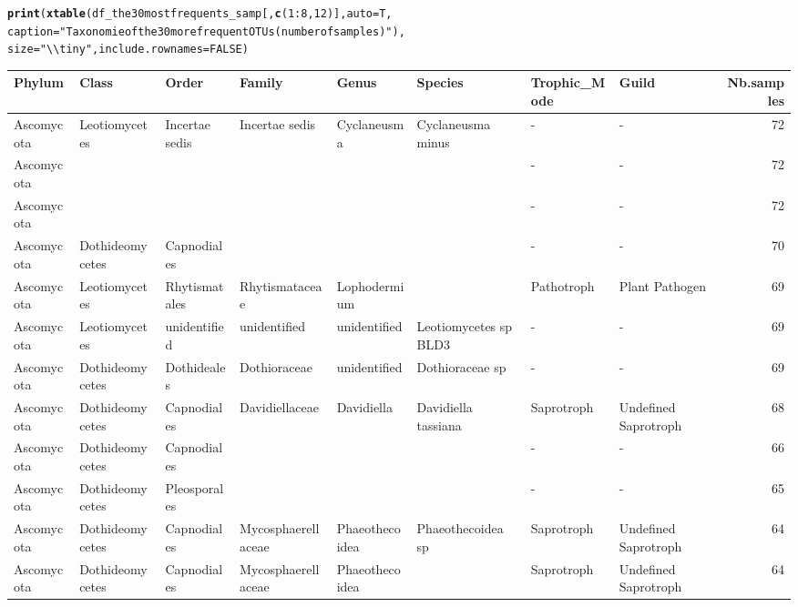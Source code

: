 \documentclass[12pt]{article}\usepackage[]{graphicx}\usepackage[]{color}
\makeatletter
\newcommand{\hlnum}[1]{\textcolor[rgb]{0.686,0.059,0.569}{#1}}%
\newcommand{\hlstr}[1]{\textcolor[rgb]{0.192,0.494,0.8}{#1}}%
\newcommand{\hlopt}[1]{\textcolor[rgb]{0,0,0}{#1}}%
\newcommand{\hlstd}[1]{\textcolor[rgb]{0.345,0.345,0.345}{#1}}%
\newcommand{\hlkwc}[1]{\textcolor[rgb]{0.333,0.667,0.333}{#1}}%
\newcommand{\hlkwd}[1]{\textcolor[rgb]{0.737,0.353,0.396}{\textbf{#1}}}%
\newenvironment{kframe}{%
 \def\at@end@of@kframe{}%
 \ifinner\ifhmode%
  \def\at@end@of@kframe{\end{minipage}}%
  \begin{minipage}{\columnwidth}%
 \fi\fi%
 \def\FrameCommand##1{\hskip\@totalleftmargin \hskip-\fboxsep
 \colorbox{shadecolor}{##1}\hskip-\fboxsep
     \hskip-\linewidth \hskip-\@totalleftmargin \hskip\columnwidth}%
 \MakeFramed {\advance\hsize-\width
   \@totalleftmargin\z@ \linewidth\hsize
   \@setminipage}}%
 {\par\unskip\endMakeFramed%
 \at@end@of@kframe}
\numberwithin{figure}{section}
\makeatother
\begin{document}
\begin{landscape}
\begin{kframe}
\begin{alltt}
\hlkwd{print}\hlstd{(}\hlkwd{xtable}\hlstd{(df_the30mostfrequents_samp[,} \hlkwd{c}\hlstd{(}\hlnum{1}\hlopt{:}\hlnum{8}\hlstd{,} \hlnum{12}\hlstd{)],} \hlkwc{auto} \hlstd{= T,}
      \hlkwc{caption} \hlstd{=} \hlstr{"Taxonomie of the 30 more frequent OTUs (number of samples)"}\hlstd{),}
      \hlkwc{size} \hlstd{=} \hlstr{"\textbackslash{}\textbackslash{}tiny"}\hlstd{,} \hlkwc{include.rownames} \hlstd{=} \hlnum{FALSE}\hlstd{)}
\end{alltt}
\end{kframe}%
\begin{table}[ht]
\centering
\begingroup\tiny
\begin{tabular}{llllllllr}
  \hline
Phylum & Class & Order & Family & Genus & Species & Trophic\_Mode & Guild & Nb.samples \\ 
  \hline
Ascomycota & Leotiomycetes & Incertae sedis & Incertae sedis & Cyclaneusma & Cyclaneusma minus & - & - & 72 \\ 
  Ascomycota &  &  &  &  &  & - & - & 72 \\ 
  Ascomycota &  &  &  &  &  & - & - & 72 \\ 
  Ascomycota & Dothideomycetes & Capnodiales &  &  &  & - & - & 70 \\ 
  Ascomycota & Leotiomycetes & Rhytismatales & Rhytismataceae & Lophodermium &  & Pathotroph & Plant Pathogen & 69 \\ 
  Ascomycota & Leotiomycetes & unidentified & unidentified & unidentified & Leotiomycetes sp BLD3 & - & - & 69 \\ 
  Ascomycota & Dothideomycetes & Dothideales & Dothioraceae & unidentified & Dothioraceae sp & - & - & 69 \\ 
  Ascomycota & Dothideomycetes & Capnodiales & Davidiellaceae & Davidiella & Davidiella tassiana & Saprotroph & Undefined Saprotroph & 68 \\ 
  Ascomycota & Dothideomycetes & Capnodiales &  &  &  & - & - & 66 \\ 
  Ascomycota & Dothideomycetes & Pleosporales &  &  &  & - & - & 65 \\ 
  Ascomycota & Dothideomycetes & Capnodiales & Mycosphaerellaceae & Phaeothecoidea & Phaeothecoidea sp & Saprotroph & Undefined Saprotroph & 64 \\ 
  Ascomycota & Dothideomycetes & Capnodiales & Mycosphaerellaceae & Phaeothecoidea &  & Saprotroph & Undefined Saprotroph & 64 \\ 

\end{tabular}
\end{table}
\end{landscape}
\end{document}
